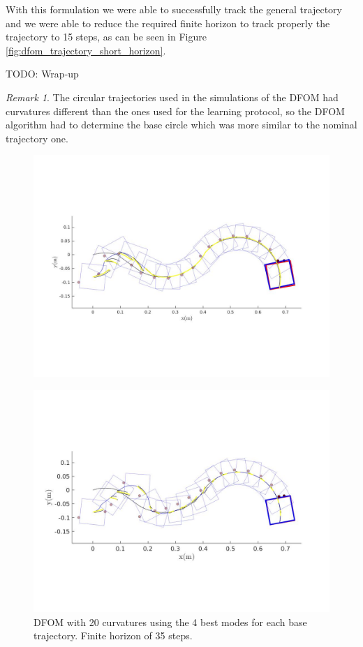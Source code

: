 \documentclass[12,twoside]{TFG-GM}
\theoremstyle{definition}
\theoremstyle{remark}
\newtheorem{remark}[theorem]{Remark}
\begin{document}
With this formulation we were able to successfully track the general trajectory and we were able to reduce the required finite horizon to track properly the trajectory to 15 steps, as can be seen in Figure \ref{fig:dfom_trajectory_short_horizon}.

TODO: Wrap-up

\begin{remark}
The circular trajectories used in the simulations of the DFOM had curvatures different than the ones used for the learning protocol, so the DFOM algorithm had to determine the base circle which was more similar to the nominal trajectory one.
\end{remark}

\begin{figure}
    \centering
    \begin{minipage}{0.7\textwidth}
        \centering
        \includegraphics[width=1\textwidth] {dfom_trajectory_long_horizon.jpg} \label{fig:dfom_trajectory_long_horizon}%
        \caption{DFOM with 20 curvatures using the 4 best modes for each base trajectory. Finite horizon of 35 steps.}
    \end{minipage}
    \begin{minipage}{0.7\textwidth}
        \centering
        \includegraphics[width=1\textwidth]{dfom_trajectory_short_horizon_15_steps.jpg} %

\end{minipage}
\end{figure}
\end{document}
